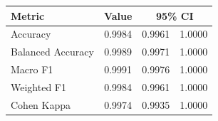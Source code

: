 \begin{tabular}{lccc}
\hline
Metric & Value & \multicolumn{2}{c}{95\% CI} \\
\hline
Accuracy & 0.9984 & 0.9961 & 1.0000 \\
Balanced Accuracy & 0.9989 & 0.9971 & 1.0000 \\
Macro F1 & 0.9991 & 0.9976 & 1.0000 \\
Weighted F1 & 0.9984 & 0.9961 & 1.0000 \\
Cohen Kappa & 0.9974 & 0.9935 & 1.0000 \\
\hline
\end{tabular}